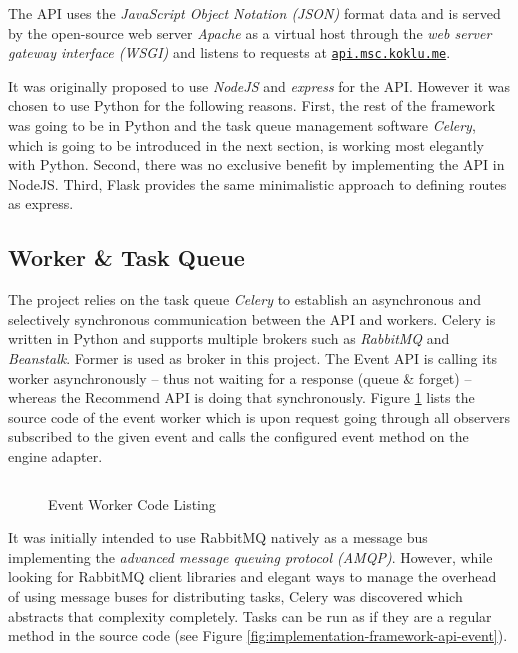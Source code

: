 The API uses the \emph{JavaScript Object Notation (JSON)} format data and is served by the open-source web server \emph{Apache} as a virtual host through the \emph{web server gateway interface (WSGI)} and listens to requests at \href{http://api.msc.koklu.me}{\texttt{api.msc.koklu.me}}.

It was originally proposed to use \emph{NodeJS} and \emph{express} for the API. However it was chosen to use Python for the following reasons. First, the rest of the framework was going to be in Python and the task queue management software \emph{Celery}, which is going to be introduced in the next section, is working most elegantly with Python. Second, there was no exclusive benefit by implementing the API in NodeJS. Third, Flask provides the same minimalistic approach to defining routes as express.

\subsection{Worker \& Task Queue}

The project relies on the task queue \emph{Celery} to establish an asynchronous and selectively synchronous communication between the API and workers. Celery is written in Python and supports multiple brokers such as \emph{RabbitMQ} and \emph{Beanstalk}. Former is used as broker in this project. The Event API is calling its worker asynchronously -- thus not waiting for a response (queue \& forget) -- whereas the Recommend API is doing that synchronously. Figure \ref{fig:implementation-framework-worker} lists the source code of the event worker which is upon request going through all observers subscribed to the given event and calls the configured event method on the engine adapter.

\begin{figure}[ht]
    \inputminted{py}{./includes/source/framework/worker/event.py}
    \caption{Event Worker Code Listing}
    \label{fig:implementation-framework-worker}
\end{figure}

It was initially intended to use RabbitMQ natively as a message bus implementing the \emph{advanced message queuing protocol (AMQP)}. However, while looking for RabbitMQ client libraries and elegant ways to manage the overhead of using message buses for distributing tasks, Celery was discovered which abstracts that complexity completely. Tasks can be run as if they are a regular method in the source code (see Figure \ref{fig:implementation-framework-api-event}).

